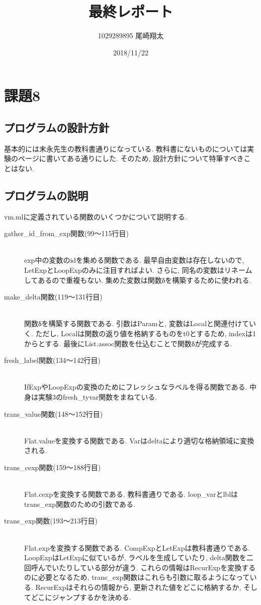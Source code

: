 \documentclass{jarticle}
\begin{document}
\title{最終レポート}
\author{1029289895 尾崎翔太}
\date{2018/11/22}

\maketitle
\newpage

\section{課題8}
\subsection{プログラムの設計方針}
基本的には末永先生の教科書通りになっている. 教科書にないものについては実験のページに書いてある通りにした. そのため, 設計方針について特筆すべきことはない.
\subsection{プログラムの説明}
vm.mlに定義されている関数のいくつかについて説明する.
\begin{description}
\item[gather\_id\_from\_exp関数(99～115行目)] \leavevmode \\
exp中の変数のidを集める関数である. 最早自由変数は存在しないので, LetExpとLoopExpのみに注目すればよい. さらに, 同名の変数はリネームしてあるので重複もない. 集めた変数は関数δを構築するために使われる.
\item[make\_delta関数(119～131行目)] \leavevmode \\
関数δを構築する関数である. 引数はParamと, 変数はLocalと関連付けていく. ただし, Localは関数の返り値を格納するものをt0とするため, indexは1からとする. 最後にList.assoc関数を仕込むことで関数δが完成する.
\item[fresh\_label関数(134～142行目)] \leavevmode \\
IfExpやLoopExpの変換のためにフレッシュなラベルを得る関数である. 中身は実験3のfresh\_tyvar関数をまねている.
\item[trans\_value関数(148～152行目)] \leavevmode \\
Flat.valueを変換する関数である. Varはdeltaにより適切な格納領域に変換される.
\item[trans\_cexp関数(159～188行目)] \leavevmode \\
Flat.cexpを変換する関数である. 教科書通りである. loop\_varとlblはtrans\_exp関数のための引数である. 
\item[trans\_exp関数(193～213行目)] \leavevmode \\
Flat.expを変換する関数である. CompExpとLetExpは教科書通りである. LoopExpはLetExpに似ているが, ラベルを生成していたり, delta関数を二回呼んでいたりしている部分が違う. これらの情報はRecurExpを変換するのに必要となるため, trans\_exp関数はこれらも引数に取るようになっている. RecurExpはそれらの情報から, 更新された値をどこに格納するか, そしてどこにジャンプするかを決める.
\end{description}
\end{document}
